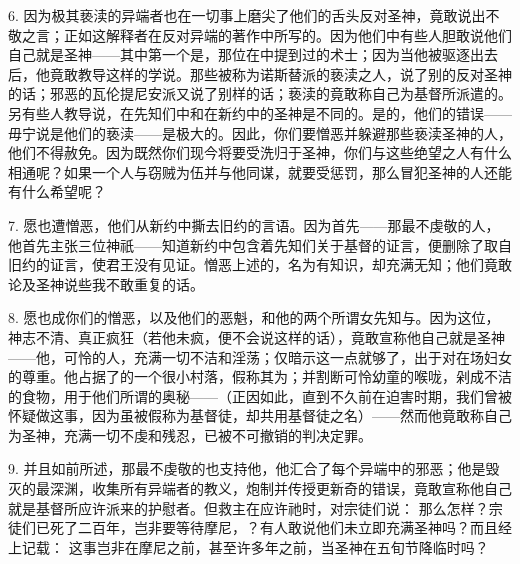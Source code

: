 6. 因为极其亵渎的异端者也在一切事上磨尖了他们的舌头反对圣神，竟敢说出不敬之言；正如这解释者在反对异端的著作中所写的。因为他们中有些人胆敢说他们自己就是圣神——其中第一个是，那位在中提到过的术士；因为当他被驱逐出去后，他竟敢教导这样的学说。那些被称为诺斯替派的亵渎之人，说了别的反对圣神的话；邪恶的瓦伦提尼安派又说了别样的话；亵渎的竟敢称自己为基督所派遣的。另有些人教导说，在先知们中和在新约中的圣神是不同的。是的，他们的错误——毋宁说是他们的亵渎——是极大的。因此，你们要憎恶并躲避那些亵渎圣神的人，他们不得赦免。因为既然你们现今将要受洗归于圣神，你们与这些绝望之人有什么相通呢？如果一个人与窃贼为伍并与他同谋，就要受惩罚，那么冒犯圣神的人还能有什么希望呢？\par

7. 愿也遭憎恶，他们从新约中撕去旧约的言语。因为首先——那最不虔敬的人，他首先主张三位神祇——知道新约中包含着先知们关于基督的证言，便删除了取自旧约的证言，使君王没有见证。憎恶上述的，名为有知识，却充满无知；他们竟敢论及圣神说些我不敢重复的话。\par

8. 愿也成你们的憎恶，以及他们的恶魁，和他的两个所谓女先知与。因为这位，神志不清、真正疯狂（若他未疯，便不会说这样的话），竟敢宣称他自己就是圣神——他，可怜的人，充满一切不洁和淫荡；仅暗示这一点就够了，出于对在场妇女的尊重。他占据了的一个很小村落，假称其为；并割断可怜幼童的喉咙，剁成不洁的食物，用于他们所谓的奥秘——（正因如此，直到不久前在迫害时期，我们曾被怀疑做这事，因为虽被假称为基督徒，却共用基督徒之名）——然而他竟敢称自己为圣神，充满一切不虔和残忍，已被不可撤销的判决定罪。\par

9. 并且如前所述，那最不虔敬的也支持他，他汇合了每个异端中的邪恶；他是毁灭的最深渊，收集所有异端者的教义，炮制并传授更新奇的错误，竟敢宣称他自己就是基督所应许派来的护慰者。但救主在应许祂时，对宗徒们说： 那么怎样？宗徒们已死了二百年，岂非要等待摩尼，？有人敢说他们未立即充满圣神吗？而且经上记载： 这事岂非在摩尼之前，甚至许多年之前，当圣神在五旬节降临时吗？\par

